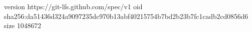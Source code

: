 version https://git-lfs.github.com/spec/v1
oid sha256:da51436d324a9097235dc970b13abf40215754b7bd2b23b7fc1cadb2cd0856d6
size 1048672
